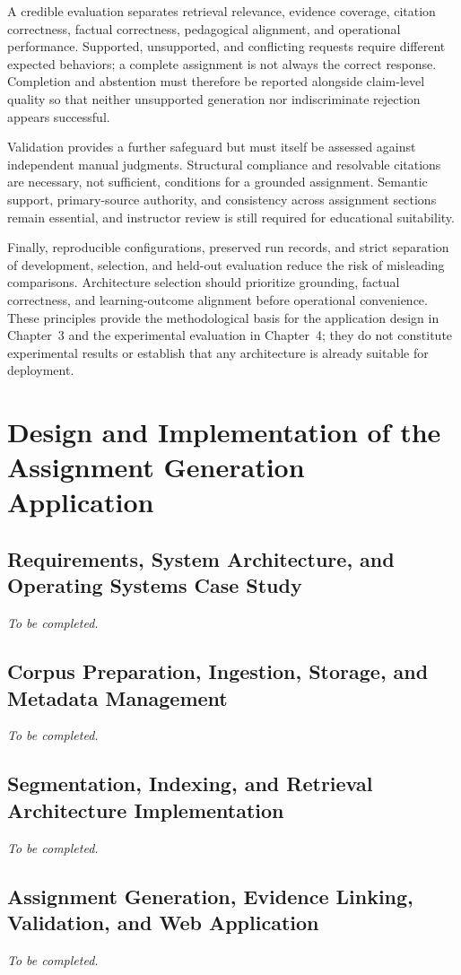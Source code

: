 \documentclass[12pt,a4paper]{report}
\numberwithin{equation}{chapter}
\begin{document}
A credible evaluation separates retrieval relevance, evidence coverage, citation correctness, factual correctness, pedagogical alignment, and operational performance. Supported, unsupported, and conflicting requests require different expected behaviors; a complete assignment is not always the correct response. Completion and abstention must therefore be reported alongside claim-level quality so that neither unsupported generation nor indiscriminate rejection appears successful.

Validation provides a further safeguard but must itself be assessed against independent manual judgments. Structural compliance and resolvable citations are necessary, not sufficient, conditions for a grounded assignment. Semantic support, primary-source authority, and consistency across assignment sections remain essential, and instructor review is still required for educational suitability.

Finally, reproducible configurations, preserved run records, and strict separation of development, selection, and held-out evaluation reduce the risk of misleading comparisons. Architecture selection should prioritize grounding, factual correctness, and learning-outcome alignment before operational convenience. These principles provide the methodological basis for the application design in Chapter~3 and the experimental evaluation in Chapter~4; they do not constitute experimental results or establish that any architecture is already suitable for deployment.

\chapter{Design and Implementation of the Assignment Generation Application}
\section{Requirements, System Architecture, and Operating Systems Case Study}
\textit{To be completed.}
\section{Corpus Preparation, Ingestion, Storage, and Metadata Management}
\textit{To be completed.}
\section{Segmentation, Indexing, and Retrieval Architecture Implementation}
\textit{To be completed.}
\section{Assignment Generation, Evidence Linking, Validation, and Web Application}
\textit{To be completed.}
\end{document}
